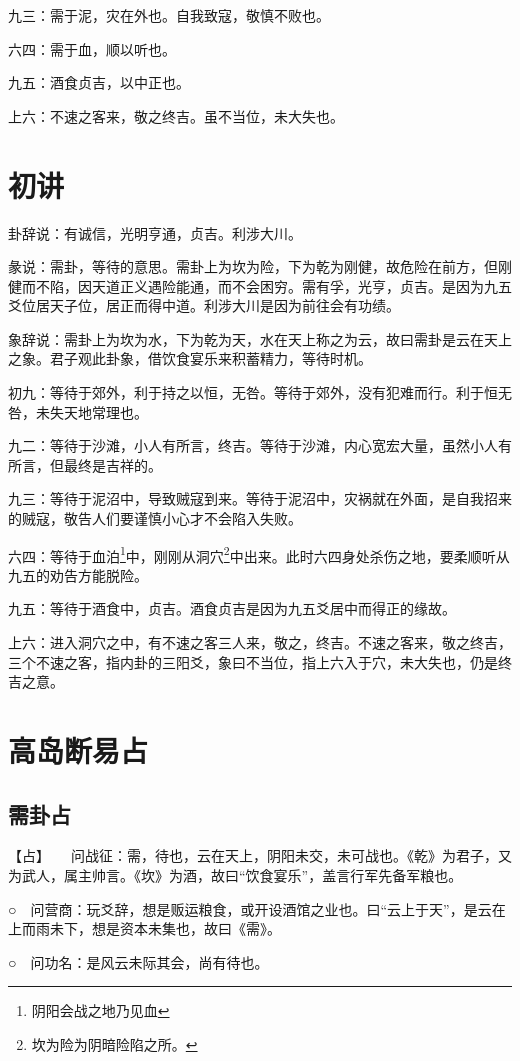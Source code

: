 \documentclass[12pt,oneside]{book}
\begin{document}
九三：需于泥，灾在外也。自我致寇，敬慎不败也。

六四：需于血，顺以听也。

九五：酒食贞吉，以中正也。

上六：不速之客来，敬之终吉。虽不当位，未大失也。

\section{初讲}
卦辞说：有诚信，光明亨通，贞吉。利涉大川。

彖说：需卦，等待的意思。需卦上为坎为险，下为乾为刚健，故危险在前方，但刚健而不陷，因天道正义遇险能通，而不会困穷。需有孚，光亨，贞吉。是因为九五爻位居天子位，居正而得中道。利涉大川是因为前往会有功绩。

象辞说：需卦上为坎为水，下为乾为天，水在天上称之为云，故曰需卦是云在天上之象。君子观此卦象，借饮食宴乐来积蓄精力，等待时机。


初九：等待于郊外，利于持之以恒，无咎。等待于郊外，没有犯难而行。利于恒无咎，未失天地常理也。

九二：等待于沙滩，小人有所言，终吉。等待于沙滩，内心宽宏大量，虽然小人有所言，但最终是吉祥的。

九三：等待于泥沼中，导致贼寇到来。等待于泥沼中，灾祸就在外面，是自我招来的贼寇，敬告人们要谨慎小心才不会陷入失败。

六四：等待于血泊\footnote{阴阳会战之地乃见血}中，刚刚从洞穴\footnote{坎为险为阴暗险陷之所。}中出来。此时六四身处杀伤之地，要柔顺听从九五的劝告方能脱险。

九五：等待于酒食中，贞吉。酒食贞吉是因为九五爻居中而得正的缘故。

上六：进入洞穴之中，有不速之客三人来，敬之，终吉。不速之客来，敬之终吉，三个不速之客，指内卦的三阳爻，象曰不当位，指上六入于穴，未大失也，仍是终吉之意。

\section{高岛断易占}
\subsection{需卦占}
【占】　　问战征：需，待也，云在天上，阴阳未交，未可战也。《乾》为君子，又为武人，属主帅言。《坎》为酒，故曰“饮食宴乐”，盖言行军先备军粮也。

○　问营商：玩爻辞，想是贩运粮食，或开设酒馆之业也。曰“云上于天”，是云在上而雨未下，想是资本未集也，故曰《需》。

○　问功名：是风云未际其会，尚有待也。
\end{document}
